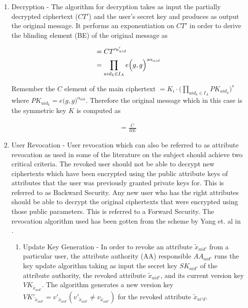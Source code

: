 \begin{enumerate}
	
	\item Decryption - The algorithm for decryption takes as input the partially decrypted ciphertext ($CT'$) and the user's secret key and produces as output the original message. It performs an exponentiation on $CT'$ in order to derive the blinding element (BE) of the original message as
	
	\begin{align*}
	&= CT'^{u'_{uid}} \\ &= \prod\limits_{aid_{k} \in I_{A}} e\Bigl(g, g\Bigl)^{s\alpha_{aid}}
	\end{align*}
	
	Remember the $C$ element of the main ciphertext $= K_i\cdot\bigl(\prod\limits_{aid_{k} \in I_{A}}PK_{aid_{k}}\bigl)^{s}$ where $PK_{aid_{k}} = e\bigl(g, g\bigl)^{\alpha_{aid}}$. Therefore the original message which in this case is the symmetric key $K$ is computed as
	
	\begin{align*}
	= \frac{C}{BE}
	\end{align*}
	
	\item User Revocation - User revocation which can also be referred to as attribute revocation as used in some of the literature on the subject should achieve two critical criteria. The revoked user should not be able to decrypt new ciphertexts which have been encrypted using the public attribute keys of attributes that the user was previously granted private keys for. This is referred to as Backward Security. Any new user who has the right attributes should be able to decrypt the original ciphertexts that were encrypted using those public parameters. This is referred to a Forward Security. The revocation algorithm used has been gotten from the scheme by Yang et. al in \cite{Yang2014}.
	
	
	\begin{enumerate}
		\item Update Key Generation - In order to revoke an attribute $\tilde{x}_{aid'}$ from a particular user, the attribute authority (AA) responsible $AA_{aid'}$ runs the key update algorithm taking as input the secret key $SK_{aid'}$ of the 
		attribute authority, the revoked attribute $\tilde{x}_{aid'}$, and its current version key $VK_{\tilde{x}_{aid'}}$.
		The algorithm generates a new version key $VK'_{\tilde{x}_{aid'}} = v'_{\tilde{x}_{aid'}} (v'_{\tilde{x}_{aid'}} \neq v_{\tilde{x}_{aid'}})$ for the revoked attribute $\tilde{x}_{ai'd}$.
		

\end{enumerate}
\end{enumerate}
